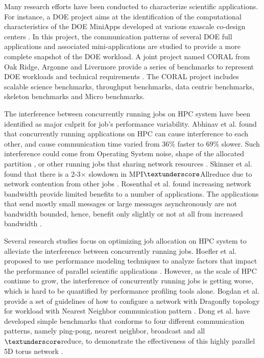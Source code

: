 \documentclass[conference]{IEEEtran}
\begin{document}

Many research efforts have been conducted to characterize scientific applications. For instance, a DOE project aims at the identification of the computational characteristics of the DOE MiniApps developed at various exascale co-design centers \cite{designforwardwebpage}. In this project, the communication patterns of several DOE full applications and associated mini-applications are studied to provide a more complete snapshot of the DOE workload. A joint project named CORAL from Oak Ridge, Argonne and Livermore provide a series of benchmarks to represent DOE workloads and technical requirements \cite{coral}. The CORAL project includes scalable science benchmarks, throughput benchmarks, data centric benchmarks, skeleton benchmarks and Micro benchmarks.  

The interference between concurrently running jobs on HPC system have been identified as major culprit for job's performance variability. Abhinav et al. found that concurrently running applications on HPC can cause interference to each other, and cause communication time varied from 36\% faster to 69\% slower. Such interference could come from Operating System noise, shape of the allocated partition , or other running jobs that sharing network resources \cite{abhinav-sc13}. Skinner et al. found that  there is a 2-3$\times$ slowdown in MPI$\textunderscore$Allreduce due to network contention from other jobs \cite{skinner}. Rosenthal et al. found increasing network bandwidth provide limited benefits to a number of applications. The applications that send mostly small messages or large messages asynchronously are not bandwidth bounded, hence, benefit only slightly or not at all from increased bandwidth \cite{rosenthal}.

Several research studies focus on optimizing job allocation on HPC system to alleviate the interference between concurrently running jobs. Hoefler et al. proposed to use performance modeling techniques to analyze factors that impact the performance of parallel scientific applications \cite{hoefler-modeling}. However, as the scale of HPC continue to grow, the  interference of concurrently running jobs is getting worse, which is hard to be quantified by performance profiling tools alone. Bogdan et al. provide a set of guidelines of how to configure a network with Dragonfly topology for workload with Nearest Neighbor communication pattern \cite{Bogdan-hpdc14}. Dong et al. have developed simple benchmarks that conforms to four different communication patterns, namely ping-pong, nearest neighbor, broadcast and all$\textunderscore$reduce, to demonstrate the effectiveness of this highly parallel 5D torus network \cite{Dong-SC11}.
\end{document}
